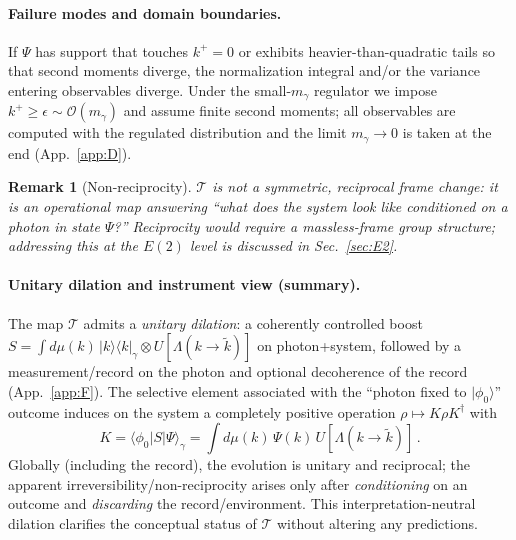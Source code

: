 \documentclass[aps,11pt]{article}
\providecommand{\bra}[1]{\langle #1|}
\providecommand{\ket}[1]{|#1\rangle}
\newcommand{\kplus}{k^{+}}
\newtheorem{remark}{Remark}
\begin{document}
\paragraph{Failure modes and domain boundaries.}
If \(\Psi\) has support that touches \(k^+=0\) or exhibits heavier-than-quadratic tails so that second moments diverge, the normalization integral and/or the variance entering observables diverge. Under the small-\(m_\gamma\) regulator we impose \(\kplus\ge \epsilon\sim\mathcal O(m_\gamma)\) and assume finite second moments; all observables are computed with the regulated distribution and the limit \(m_\gamma\to 0\) is taken at the end (App.~\ref{app:D}).

\begin{remark}[Non-reciprocity]
\(\mathcal{T}\) is not a symmetric, reciprocal frame change: it is an operational map answering “what does the system look like \emph{conditioned} on a photon in state \(\Psi\)?” Reciprocity would require a massless-frame group structure; addressing this at the \(E(2)\) level is discussed in Sec.~\ref{sec:E2}.
\end{remark}

\paragraph{Unitary dilation and instrument view (summary).}
The map \(\mathcal T\) admits a \emph{unitary dilation}: a coherently controlled boost
\(S=\int d\mu(k)\,\ket{k}\!\bra{k}_\gamma\otimes U[\Lambda(k\!\to\!\tilde k)]\)
on photon+system, followed by a measurement/record on the photon and optional decoherence of the record (App.~\ref{app:F}). The selective element associated with the “photon fixed to \(\ket{\phi_0}\)” outcome induces on the system a completely positive operation \(\rho\mapsto K\rho K^\dagger\) with
\begin{equation}\label{eq:Kdef_main}
K=\bra{\phi_0}S\ket{\Psi}_\gamma=\int d\mu(k)\,\Psi(k)\,U[\Lambda(k\!\to\!\tilde k)]\,.
\end{equation}
Globally (including the record), the evolution is unitary and reciprocal; the apparent irreversibility/non-reciprocity arises only after \emph{conditioning} on an outcome and \emph{discarding} the record/environment. This interpretation-neutral dilation clarifies the conceptual status of \(\mathcal T\) without altering any predictions.
\end{document}

